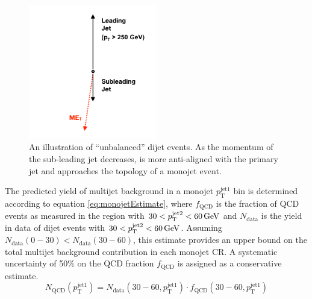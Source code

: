 \begin{figure}
	\centering
	\includegraphics[width=0.5\textwidth]{backgrounds/figs/dijet_cartoon_Moriond2017}
	\renewcommand{\baselinestretch}{1.0}
	\caption[An illustration of ``unbalanced'' dijet events.]{An illustration of ``unbalanced'' dijet events. As the momentum of the sub-leading jet decreases, \MET is more anti-aligned with the primary jet and approaches the topology of a monojet event.}
	\label{fig:monojetCartoon}
\end{figure}

The predicted yield of multijet background in a monojet $p_{\mathrm{T}}^{\mathrm{jet1}}$ bin is determined according to equation \ref{eq:monojetEstimate}, where $f_{\mathrm{QCD}}$ is the fraction of QCD events as measured in the region with $30 < p_{\mathrm{T}}^{\mathrm{jet2}} < 60 \,\text{Ge\hspace{-.08em}V}$ and $N_{\mathrm{data}}$ is the yield in data of dijet events with $30 < p_{\mathrm{T}}^{\mathrm{jet2}} < 60 \,\text{Ge\hspace{-.08em}V}$. Assuming $N_{\mathrm{data}}(0-30) < N_{\mathrm{data}}(30-60)$, this estimate provides an upper bound on the total multijet background contribution in each monojet CR. A systematic uncertainty of 50\% on the QCD fraction $f_{\mathrm{QCD}}$ is assigned as a conservative estimate.
\begin{equation}
	N_{\mathrm{QCD}}(p_{\mathrm{T}}^{\mathrm{jet1}}) = N_{\mathrm{data}}(30-60,p_{\mathrm{T}}^{\mathrm{jet1}}) \cdot f_{\mathrm{QCD}}(30-60,p_{\mathrm{T}}^{\mathrm{jet1}})
	\label{eq:monojetEstimate}
\end{equation}

